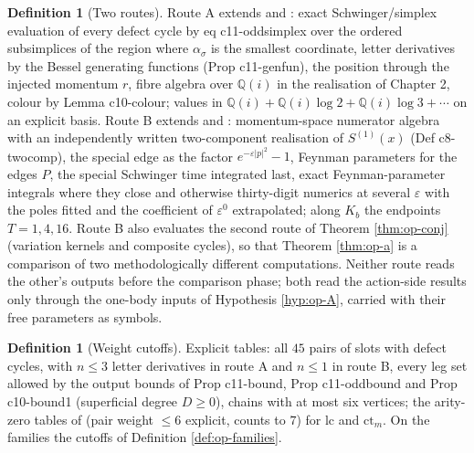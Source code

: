 \documentclass[11pt]{article}
\numberwithin{equation}{section}
\theoremstyle{plain}
\theoremstyle{definition}
\newtheorem{definition}[theorem]{Definition}
\newcommand{\lc}{\mathrm{lc}}
\newcommand{\ct}{\mathrm{ct}}
\begin{document}
\begin{definition}[Two routes]
\label{def:op-routes}
Route A extends  and : exact Schwinger/simplex evaluation of every defect cycle by eq c11-oddsimplex over the ordered subsimplices of the region where $\alpha_\sigma$ is the smallest coordinate, letter derivatives by the Bessel generating functions (Prop c11-genfun), the position through the injected momentum $r$, fibre algebra over $\mathbb Q(i)$ in the realisation of Chapter 2, colour by Lemma c10-colour; values in $\mathbb Q(i)+\mathbb Q(i)\log2+\mathbb Q(i)\log3+\cdots$ on an explicit basis. Route B extends  and : momentum-space numerator algebra with an independently written two-component realisation of $S^{(1)}(x)$ (Def c8-twocomp), the special edge as the factor $e^{-\varepsilon|p|^2}-1$, Feynman parameters for the edges $P$, the special Schwinger time integrated last, exact Feynman-parameter integrals where they close and otherwise thirty-digit numerics at several $\varepsilon$ with the poles fitted and the coefficient of $\varepsilon^0$ extrapolated; along $K_b$ the endpoints $T=1,4,16$. Route B also evaluates the second route of Theorem \ref{thm:op-conj} (variation kernels and composite cycles), so that Theorem \ref{thm:op-a} is a comparison of two methodologically different computations. Neither route reads the other's outputs before the comparison phase; both read the action-side results only through the one-body inputs of Hypothesis \ref{hyp:op-A}, carried with their free parameters as symbols.
\end{definition}

\begin{definition}[Weight cutoffs]
\label{def:op-cutoffs}
Explicit tables: all $45$ pairs of slots with defect cycles, with $n\le3$ letter derivatives in route A and $n\le1$ in route B, every leg set allowed by the output bounds of Prop c11-bound, Prop c11-oddbound and Prop c10-bound1 (superficial degree $D\ge0$), chains with at most six vertices; the arity-zero tables of  (pair weight $\le6$ explicit, counts to $7$) for $\lc$ and $\ct_m$. On the families the cutoffs of Definition \ref{def:op-families}.
\end{definition}
\end{document}
